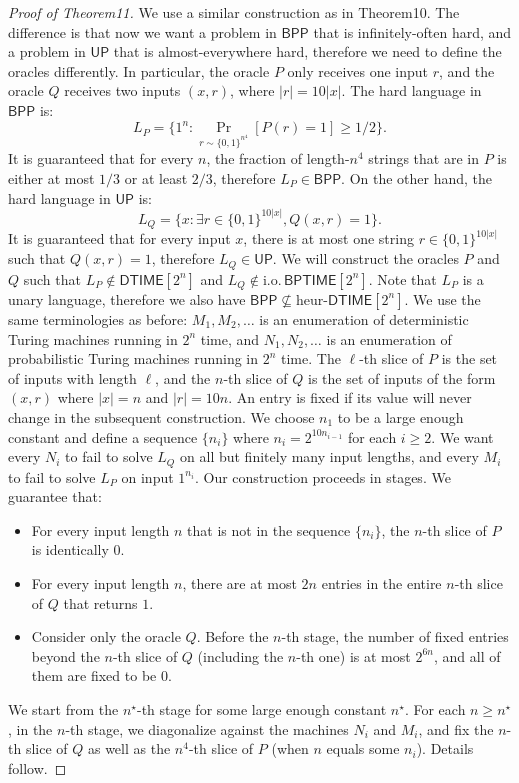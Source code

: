 \begin{proof}[Proof of Theorem11]
We use a similar construction as in Theorem10. The difference is that now we want a problem in $\mathsf{BPP}$ that is infinitely-often hard, and a problem in $\mathsf{UP}$ that is almost-everywhere hard, therefore we need to define the oracles differently. In particular, the oracle $P$ only receives one input $r$, and the oracle $Q$ receives two inputs $(x,r)$, where $|r|=10|x|$. The hard language in $\mathsf{BPP}$ is:
\[L_P=\{1^n:\Pr_{r\sim\{0,1\}^{n^4}}[P(r)=1]\geq1/2\}.\]
It is guaranteed that for every $n$, the fraction of length-$n^4$ strings that are in $P$ is either at most $1/3$ or at least $2/3$, therefore $L_P\in\mathsf{BPP}$. On the other hand, the hard language in $\mathsf{UP}$ is:
\[L_Q=\{x:\exists r\in\{0,1\}^{10|x|},Q(x,r)=1\}.\]
It is guaranteed that for every input $x$, there is at most one string $r\in\{0,1\}^{10|x|}$ such that $Q(x,r)=1$, therefore $L_Q\in\mathsf{UP}$. We will construct the oracles $P$ and $Q$ such that $L_P\notin\mathsf{DTIME}[2^n]$ and $L_Q\notin\mathrm{i.o.}\,\mathsf{BPTIME}[2^n]$. Note that $L_P$ is a unary language, therefore we also have $\mathsf{BPP}\not\subseteq\mathrm{heur}\text{-}\mathsf{DTIME}[2^n]$.
We use the same terminologies as before: $M_1,M_2,\ldots$ is an enumeration of deterministic Turing machines running in $2^n$ time, and $N_1,N_2,\ldots$ is an enumeration of probabilistic Turing machines running in $2^n$ time. The $\ell$-th slice of $P$ is the set of inputs with length $\ell$, and the $n$-th slice of $Q$ is the set of inputs of the form $(x,r)$ where $|x|=n$ and $|r|=10n$. An entry is fixed if its value will never change in the subsequent construction. We choose $n_1$ to be a large enough constant and define a sequence $\{n_i\}$ where $n_i=2^{10n_{i-1}}$ for each $i\geq2$. We want every $N_i$ to fail to solve $L_Q$ on all but finitely many input lengths, and every $M_i$ to fail to solve $L_P$ on input $1^{n_i}$.
Our construction proceeds in stages. We guarantee that:
\begin{itemize}
\item For every input length $n$ that is not in the sequence $\{n_i\}$, the $n$-th slice of $P$ is identically $0$.
\item For every input length $n$, there are at most $2n$ entries in the entire $n$-th slice of $Q$ that returns $1$.
\item Consider only the oracle $Q$. Before the $n$-th stage, the number of fixed entries beyond the $n$-th slice of $Q$ (including the $n$-th one) is at most $2^{6n}$, and all of them are fixed to be $0$.
\end{itemize}
We start from the $n^{\star}$-th stage for some large enough constant $n^{\star}$. For each $n\geq n^{\star}$, in the $n$-th stage, we diagonalize against the machines $N_i$ and $M_i$, and fix the $n$-th slice of $Q$ as well as the $n^4$-th slice of $P$ (when $n$ equals some $n_i$). Details follow.

\end{proof}
